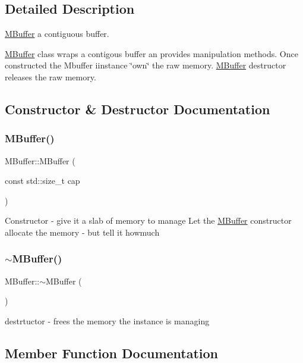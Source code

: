 \subsection{Detailed Description}
\hyperlink{struct_m_buffer}{M\+Buffer} a contiguous buffer. 

\hyperlink{struct_m_buffer}{M\+Buffer} class wraps a contigous buffer an provides manipulation methods. Once constructed the Mbuffer iinstance \char`\"{}own\char`\"{} the raw memory. \hyperlink{struct_m_buffer}{M\+Buffer} destructor releases the raw memory. 

\subsection{Constructor \& Destructor Documentation}
\mbox{\label{struct_m_buffer_a4f12e1ae3dc9acf4739f4cb8df49cb98}} 
\subsubsection{\texorpdfstring{M\+Buffer()}{MBuffer()}}
{\footnotesize\ttfamily M\+Buffer\+::\+M\+Buffer (\begin{DoxyParamCaption}\item[{const std\+::size\+\_\+t}]{cap }\end{DoxyParamCaption})}

Constructor -\/ give it a slab of memory to manage Let the \hyperlink{struct_m_buffer}{M\+Buffer} constructor allocate the memory -\/ but tell it howmuch \mbox{\label{struct_m_buffer_a7afd94b5e8b2a26ffab8ede1aef06f07}} 
\subsubsection{\texorpdfstring{$\sim$\+M\+Buffer()}{~MBuffer()}}
{\footnotesize\ttfamily M\+Buffer\+::$\sim$\+M\+Buffer (\begin{DoxyParamCaption}{ }\end{DoxyParamCaption})}

destrtuctor -\/ frees the memory the instance is managing 

\subsection{Member Function Documentation}
\mbox{\label{struct_m_buffer_abb2765e8b761bbd0c17fdd7bdaada053}} 
